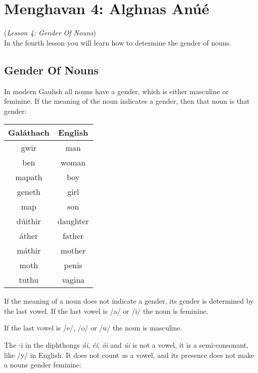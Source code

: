 \section{Menghavan 4: Alghnas An\'{u}\'{e}}
(\textit{Lesson 4: Gender Of Nouns})\\

In the fourth lesson you will learn how to determine the gender of nouns.

\subsection{Gender Of Nouns}

In modern Gaulish all nouns have a gender, which is either masculine or feminine. If the meaning of the noun indicates a gender, then that noun is that gender:
\begin{table}[H]
\centering
\begin{tabu}{c|c}
  \textbf{Gal\'{a}thach} & \textbf{English}\\
  \toprule
  gwir & man\\
  ben & woman\\
  mapath & boy\\
  geneth & girl\\
  map & son\\
  d\'{u}ithir & daughter\\
  \'{a}ther & father\\
  m\'{a}thir & mother\\
  moth & penis\\
  tuthu & vagina
\end{tabu}
\label{example_gender_meaning}
\end{table}

If the meaning of a noun does not indicate a gender, its gender is determined by the last vowel. If the last vowel is /a/ or /i/ the noun is feminine.

If the last vowel is /e/, /o/ or /u/ the noun is masculine.

The -i in the diphthongs \textit{\'{a}i}, \textit{\'{e}i}, \textit{\'{o}i} and \textit{\'{u}i} is not a vowel, it is a semi-consonant, like /y/ in English. It does not count as a vowel, and its presence does not make a nouns gender feminine:

